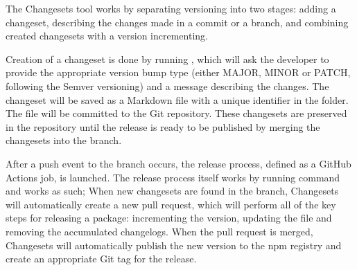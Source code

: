 The Changesets tool works by separating versioning into two stages: adding a changeset, describing the changes made in a commit or a branch, and combining created changesets with a version incrementing.

Creation of a changeset is done by running , which will ask the developer to provide the appropriate version bump type (either MAJOR, MINOR or PATCH, following the Semver versioning) and a message describing the changes. The changeset will be saved as a Markdown file with a unique identifier in the  folder. The file will be committed to the Git repository. These changesets are preserved in the repository until the release is ready to be published by merging the changesets into the  branch.

After a push event to the  branch occurs, the release process, defined as a GitHub Actions job, is launched. The release process itself works by running  command and works as such; When new changesets are found in the  branch, Changesets will automatically create a new pull request, which will perform all of the key steps for releasing a package: incrementing the version, updating the  file and removing the accumulated changelogs. When the pull request is merged, Changesets will automatically publish the new version to the \acrshort{npm} registry and create an appropriate Git tag for the release.